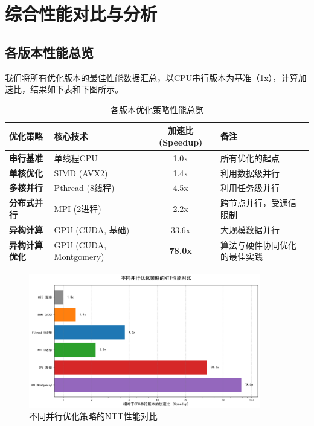 \documentclass[a4paper]{article}
\begin{document}
\section{综合性能对比与分析}

\subsection{各版本性能总览}
我们将所有优化版本的最佳性能数据汇总，以CPU串行版本为基准（1x），计算加速比，结果如下表和下图所示。

\begin{table}[H]
    \centering
    \caption{各版本优化策略性能总览}
    \label{tab:summary_perf}
    \begin{tabular}{llcl}
    \toprule
    \textbf{优化策略} & \textbf{核心技术} & \textbf{加速比 (Speedup)} & \textbf{备注} \\
    \midrule
    \textbf{串行基准} & 单线程CPU & 1.0x & 所有优化的起点 \\
    \textbf{单核优化} & SIMD (AVX2) & 1.4x & 利用数据级并行 \\
    \textbf{多核并行} & Pthread (8线程) & 4.5x & 利用任务级并行 \\
    \textbf{分布式并行} & MPI (2进程) & 2.2x & 跨节点并行，受通信限制 \\
    \textbf{异构计算} & GPU (CUDA, 基础) & 33.6x & 大规模数据并行 \\
    \textbf{异构计算优化} & GPU (CUDA, Montgomery) & \textbf{78.0x} & 算法与硬件协同优化的最佳实践 \\
    \bottomrule
    \end{tabular}
\end{table}

\begin{figure}[H]
    \centering
    \includegraphics[width=0.9\textwidth]{fig/summary_performance_comparison.png}
    \caption{不同并行优化策略的NTT性能对比}
    \label{fig:summary_perf}
\end{figure}
\end{document}
